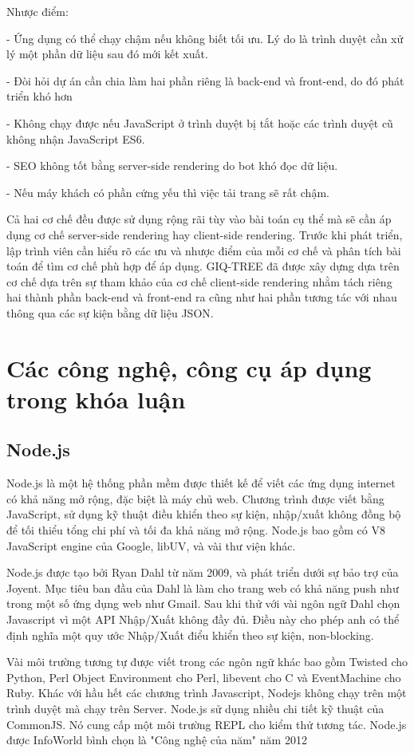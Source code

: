\documentclass[12pt]{report}
\begin{document}
Nhược điểm:

- Ứng dụng có thể chạy chậm nếu không biết tối ưu. Lý do là trình duyệt cần xử lý một phần dữ liệu sau đó mới kết xuất.

- Đòi hỏi dự án cần chia làm hai phần riêng là back-end và front-end, do đó phát triển khó hơn

- Không chạy được nếu JavaScript ở trình duyệt bị tắt hoặc các trình duyệt cũ không nhận JavaScript ES6.

- SEO không tốt bằng server-side rendering do bot khó đọc dữ liệu.

- Nếu máy khách có phần cứng yếu thì việc tải trang sẽ rất chậm.

Cả hai cơ chế đều được sử dụng rộng rãi tùy vào bài toán cụ thể mà sẽ cần áp dụng cơ chế server-side rendering hay client-side rendering. Trước khi phát triển, lập trình viên cần hiểu rõ các ưu và nhược điểm của mỗi cơ chế và phân tích bài toán để tìm cơ chế phù hợp để áp dụng. GIQ-TREE đã được xây dựng dựa trên cơ chế dựa trên sự tham khảo của cơ chế client-side rendering nhằm tách riêng hai thành phần back-end và front-end ra cũng như hai phần tương tác với nhau thông qua các sự kiện bằng dữ liệu JSON.

\section{Các công nghệ, công cụ áp dụng trong khóa luận}
\subsection{Node.js}
Node.js là một hệ thống phần mềm được thiết kế để viết các ứng dụng internet có khả năng mở rộng, đặc biệt là máy chủ web. Chương trình được viết bằng JavaScript, sử dụng kỹ thuật điều khiển theo sự kiện, nhập/xuất không đồng bộ để tối thiểu tổng chi phí và tối đa khả năng mở rộng. Node.js bao gồm có V8 JavaScript engine của Google, libUV, và vài thư viện khác.

Node.js được tạo bởi Ryan Dahl từ năm 2009, và phát triển dưới sự bảo trợ của Joyent.
Mục tiêu ban đầu của Dahl là làm cho trang web có khả năng push như trong một số ứng dụng web như Gmail. Sau khi thử với vài ngôn ngữ Dahl chọn Javascript vì một API Nhập/Xuất không đầy đủ. Điều này cho phép anh có thể định nghĩa một quy ước Nhập/Xuất điểu khiển theo sự kiện, non-blocking.

Vài môi trường tương tự được viết trong các ngôn ngữ khác bao gồm Twisted cho Python, Perl Object Environment cho Perl, libevent cho C và EventMachine cho Ruby. Khác với hầu hết các chương trình Javascript, Nodejs không chạy trên một trình duyệt mà chạy trên Server. Node.js sử dụng nhiều chi tiết kỹ thuật của CommonJS. Nó cung cấp một môi trường REPL cho kiểm thử tương tác. Node.js được InfoWorld bình chọn là "Công nghệ của năm" năm 2012
\end{document}
